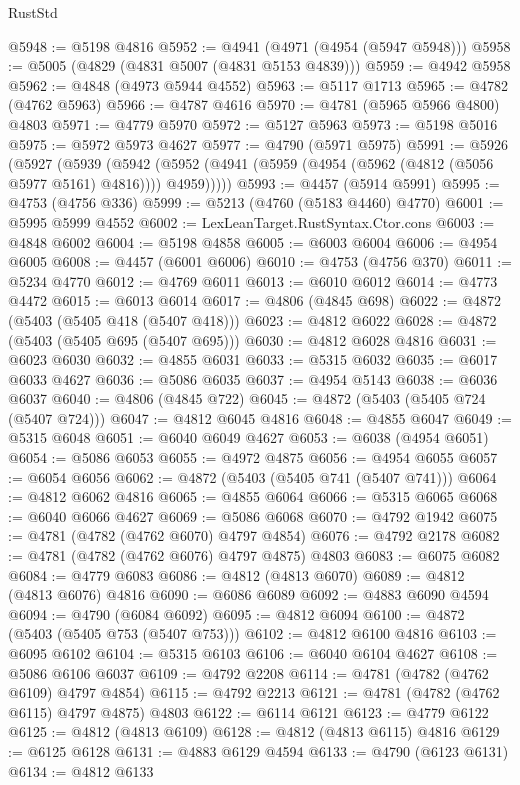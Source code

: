 \begin{lexlean}{RustStd}
\begin{coremodule}
@5948 := @5198 @4816
@5952 := @4941 (@4971 (@4954 (@5947 @5948)))
@5958 := @5005 (@4829 (@4831 @5007 (@4831 @5153 @4839)))
@5959 := @4942 @5958
@5962 := @4848 (@4973 @5944 @4552)
@5963 := @5117 @1713
@5965 := @4782 (@4762 @5963)
@5966 := @4787 @4616
@5970 := @4781 (@5965 @5966 @4800) @4803
@5971 := @4779 @5970
@5972 := @5127 @5963
@5973 := @5198 @5016
@5975 := @5972 @5973 @4627
@5977 := @4790 (@5971 @5975)
@5991 := @5926
    (@5927
      (@5939
        (@5942 (@5952 (@4941 (@5959 (@4954 (@5962 (@4812 (@5056 @5977 @5161) @4816)))) @4959)))))
@5993 := @4457 (@5914 @5991)
@5995 := @4753 (@4756 @336)
@5999 := @5213 (@4760 (@5183 @4460) @4770)
@6001 := @5995 @5999 @4552
@6002 := LexLeanTarget.RustSyntax.Ctor.cons
@6003 := @4848 @6002
@6004 := @5198 @4858
@6005 := @6003 @6004
@6006 := @4954 @6005
@6008 := @4457 (@6001 @6006)
@6010 := @4753 (@4756 @370)
@6011 := @5234 @4770
@6012 := @4769 @6011
@6013 := @6010 @6012
@6014 := @4773 @4472
@6015 := @6013 @6014
@6017 := @4806 (@4845 @698)
@6022 := @4872 (@5403 (@5405 @418 (@5407 @418)))
@6023 := @4812 @6022
@6028 := @4872 (@5403 (@5405 @695 (@5407 @695)))
@6030 := @4812 @6028 @4816
@6031 := @6023 @6030
@6032 := @4855 @6031
@6033 := @5315 @6032
@6035 := @6017 @6033 @4627
@6036 := @5086 @6035
@6037 := @4954 @5143
@6038 := @6036 @6037
@6040 := @4806 (@4845 @722)
@6045 := @4872 (@5403 (@5405 @724 (@5407 @724)))
@6047 := @4812 @6045 @4816
@6048 := @4855 @6047
@6049 := @5315 @6048
@6051 := @6040 @6049 @4627
@6053 := @6038 (@4954 @6051)
@6054 := @5086 @6053
@6055 := @4972 @4875
@6056 := @4954 @6055
@6057 := @6054 @6056
@6062 := @4872 (@5403 (@5405 @741 (@5407 @741)))
@6064 := @4812 @6062 @4816
@6065 := @4855 @6064
@6066 := @5315 @6065
@6068 := @6040 @6066 @4627
@6069 := @5086 @6068
@6070 := @4792 @1942
@6075 := @4781 (@4782 (@4762 @6070) @4797 @4854)
@6076 := @4792 @2178
@6082 := @4781 (@4782 (@4762 @6076) @4797 @4875) @4803
@6083 := @6075 @6082
@6084 := @4779 @6083
@6086 := @4812 (@4813 @6070)
@6089 := @4812 (@4813 @6076) @4816
@6090 := @6086 @6089
@6092 := @4883 @6090 @4594
@6094 := @4790 (@6084 @6092)
@6095 := @4812 @6094
@6100 := @4872 (@5403 (@5405 @753 (@5407 @753)))
@6102 := @4812 @6100 @4816
@6103 := @6095 @6102
@6104 := @5315 @6103
@6106 := @6040 @6104 @4627
@6108 := @5086 @6106 @6037
@6109 := @4792 @2208
@6114 := @4781 (@4782 (@4762 @6109) @4797 @4854)
@6115 := @4792 @2213
@6121 := @4781 (@4782 (@4762 @6115) @4797 @4875) @4803
@6122 := @6114 @6121
@6123 := @4779 @6122
@6125 := @4812 (@4813 @6109)
@6128 := @4812 (@4813 @6115) @4816
@6129 := @6125 @6128
@6131 := @4883 @6129 @4594
@6133 := @4790 (@6123 @6131)
@6134 := @4812 @6133

\end{coremodule}
\end{lexlean}
